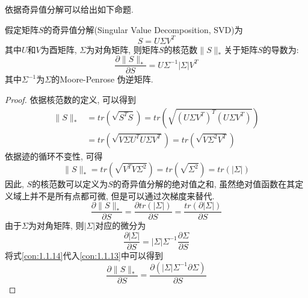 \documentclass[lang=cn,10pt]{gorgeousnbook}
\numberwithin{equation}{section}%
\numberwithin{figure}{section}%
\begin{document}
依据奇异值分解可以给出如下命题.
\begin{proposition}
假定矩阵$S$的奇异值分解(Singular Value Decomposition, SVD)为
\begin{equation}
S=U\varSigma V^T \label{con:1.1.10}
\end{equation}
其中$U$和$V$为酉矩阵, $\varSigma $为对角矩阵, 则矩阵$S$的核范数$\lVert S \rVert _*$关于矩阵$S$的导数为:
\begin{equation}
\frac{\partial \lVert S \rVert _*}{\partial S}=U\varSigma ^{-1}\left| \varSigma \right|V^T
\end{equation}
其中$\varSigma ^{-1}$为$\varSigma$的Moore-Penrose 伪逆矩阵. 
\end{proposition}
\begin{proof}
依据核范数的定义, 可以得到
\begin{equation}
\begin{aligned}
\lVert S \rVert _*&=tr\left( \sqrt{S^TS} \right) =tr\left( \sqrt{\left( U\varSigma V^T \right) ^T\left( U\varSigma V^T \right)} \right) \\
&=tr\left( \sqrt{V\varSigma U^TU\varSigma V^T} \right) =tr\left( \sqrt{V\varSigma ^2V^T} \right) 
\end{aligned}
\end{equation}
依据迹的循环不变性, 可得
\begin{equation}
\lVert S \rVert _*=tr\left( \sqrt{V^TV\varSigma ^2} \right) =tr\left( \sqrt{\varSigma ^2} \right) =tr\left( \left| \varSigma \right| \right) 
\end{equation}
因此, $S$的核范数可以定义为$S$的奇异值分解的绝对值之和, 虽然绝对值函数在其定义域上并不是所有点都可微, 但是可以通过次梯度来替代.
\begin{equation}
\frac{\partial \lVert S \rVert _*}{\partial S}=\frac{\partial tr\left( \left| \varSigma \right| \right)}{\partial S}=\frac{tr\left( \partial \left| \varSigma \right| \right)}{\partial S}\label{con:1.1.13}
\end{equation}
由于$\varSigma$为对角矩阵, 则$\left| \varSigma \right|$对应的微分为
\begin{equation}
\frac{\partial \left| \varSigma \right|}{\partial S}=\left| \varSigma \right|\varSigma ^{-1}\frac{\partial \varSigma}{\partial S}
\label{con:1.1.14}
\end{equation}
将式\eqref{con:1.1.14}代入\eqref{con:1.1.13}中可以得到
\begin{equation}
\frac{\partial \lVert S \rVert _*}{\partial S}=\frac{\partial \left( \left| \varSigma \right|\varSigma ^{-1}\partial \varSigma \right)}{\partial S}

\end{equation}
\end{proof}
\end{document}
